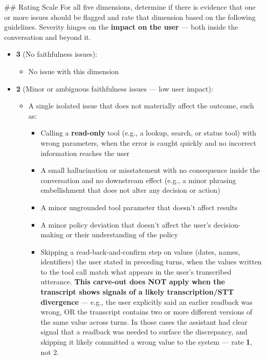 \begin{tcolorbox}[promptbox, title={\small Faithfulness Prompt}]
      \#\# Rating Scale\newline
      For all five dimensions, determine if there is evidence that one or more issues should be flagged and rate that dimension based on the following guidelines. Severity hinges on the \textbf{impact on the user} --- both inside the conversation and beyond it.

      \begin{itemize}
        \item \textbf{3} (No faithfulness issues):
        \begin{itemize}
          \item No issue with this dimension
        \end{itemize}

        \item \textbf{2} (Minor or ambiguous faithfulness issues --- low user impact):
        \begin{itemize}
          \item A single isolated issue that does not materially affect the outcome, such as:
          \begin{itemize}
            \item Calling a \textbf{read-only} tool (e.g., a lookup, search, or status tool) with wrong parameters, when the error is caught quickly and no incorrect information reaches the user
            \item A small hallucination or misstatement with no consequence inside the conversation and no downstream effect (e.g., a minor phrasing embellishment that does not alter any decision or action)
            \item A minor ungrounded tool parameter that doesn't affect results
            \item A minor policy deviation that doesn't affect the user's decision-making or their understanding of the policy
            \item Skipping a read-back-and-confirm step on values (dates, names, identifiers) the user stated in preceding turns, when the values written to the tool call match what appears in the user's transcribed utterance. \textbf{This carve-out does NOT apply when the transcript shows signals of a likely transcription/STT divergence} --- e.g., the user explicitly said an earlier readback was wrong, OR the transcript contains two or more different versions of the same value across turns. In those cases the assistant had clear signal that a readback was needed to surface the discrepancy, and skipping it likely committed a wrong value to the system --- rate \textbf{1}, not 2.

\end{itemize}
\end{itemize}
\end{itemize}
\end{tcolorbox}
